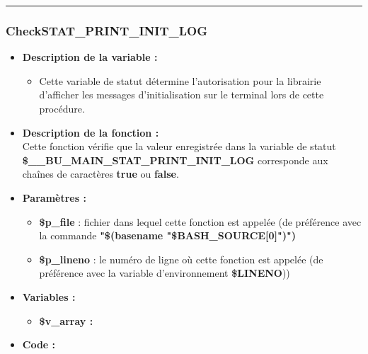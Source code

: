 \documentclass[a4paper,10pt]{article}
\begin{document}
\color{blue}\par\noindent\rule{\textwidth}{0.4pt}\color{white}

\color{blue}
\subsubsection{CheckSTAT\_PRINT\_INIT\_LOG}\color{white}
\begin{itemize}
    \item \textbf{Description de la variable :}
    \begin{itemize}
        \item Cette variable de statut détermine l'autorisation pour la librairie d'afficher les messages d'initialisation sur le terminal lors de cette procédure.\\[1\baselineskip]
    \end{itemize}


    \item \textbf{Description de la fonction :}\\
        Cette fonction vérifie que la valeur enregistrée dans la variable de statut\\ \textbf{\color{orange}\$\_\_BU\_MAIN\_STAT\_PRINT\_INIT\_LOG} corresponde aux chaînes de caractères \textbf{true} ou \textbf{false}.\\[1\baselineskip]

    \item \textbf{Paramètres :}
    \begin{itemize}
        \item \color{orange}\textbf{\$p\_file}\color{white} : fichier dans lequel cette fonction est appelée (de préférence avec la commande \textbf{"\$(\color{gray}basename \color{white}"\color{orange}\$BASH\_SOURCE[0]\color{white}")")}\\[1\baselineskip]

        \item \color{orange}\textbf{\$p\_lineno}\color{white} : le numéro de ligne où cette fonction est appelée (de préférence avec la variable d'environnement \textbf{\color{orange}\$LINENO}))\\[1\baselineskip]
    \end{itemize}

    \item \textbf{Variables :}
    \begin{itemize}
        \item \textbf{\color{orange}\$v\_array\color{white} :}\\[1\baselineskip]
    \end{itemize}


    \item \textbf{Code :}
\end{itemize}
\end{document}
